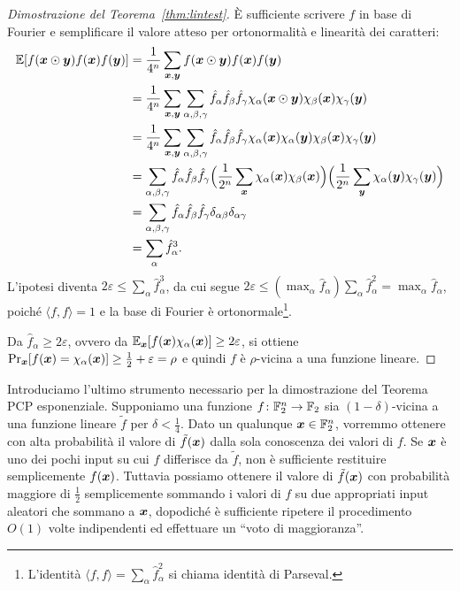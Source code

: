\begin{proof}[Dimostrazione del Teorema~\ref{thm:lintest}]
	È sufficiente scrivere $f$ in base di Fourier e semplificare il valore atteso
	per ortonormalità e linearità dei caratteri:
	\begin{align*}
		\mathbb{E}[f(\bm{x} \odot \bm{y})f(\bm{x})f(\bm{y})] &=
			\frac1{4^n} \sum_{\bm{x}, \bm{y}} f(\bm{x} \odot \bm{y}) f(\bm{x}) f(\bm{y}) \\
		&= \frac1{4^n} \sum_{\bm{x}, \bm{y}} \sum_{\alpha, \beta, \gamma}
			\hat{f}_\alpha \hat{f}_\beta \hat{f}_\gamma
			\chi_\alpha (\bm{x} \odot \bm{y}) \chi_\beta(\bm{x}) \chi_\gamma(\bm{y}) \\
		&= \frac1{4^n} \sum_{\bm{x}, \bm{y}} \sum_{\alpha, \beta, \gamma}
			\hat{f}_\alpha \hat{f}_\beta \hat{f}_\gamma
			\chi_\alpha(\bm{x}) \chi_\alpha(\bm{y}) \chi_\beta(\bm{x}) \chi_\gamma(\bm{y}) \\
		&= \sum_{\alpha, \beta, \gamma}
			\hat{f}_\alpha \hat{f}_\beta \hat{f}_\gamma
			\Big( \frac1{2^n} \sum_{\bm{x}} \chi_\alpha(\bm{x}) \chi_\beta(\bm{x}) \Big)
			\Big( \frac1{2^n} \sum_{\bm{y}} \chi_\alpha(\bm{y}) \chi_\gamma(\bm{y}) \Big) \\
		&= \sum_{\alpha, \beta, \gamma}
			\hat{f}_\alpha \hat{f}_\beta \hat{f}_\gamma
			\delta_{\alpha \beta} \delta_{\alpha \gamma} \\
		&= \sum_{\alpha} \hat{f}_\alpha^3.
	\end{align*}
	L'ipotesi diventa $2 \varepsilon \le \sum_{\alpha} \hat{f}_\alpha^3$, da
	cui segue $2 \varepsilon \le (\max_\alpha \hat{f}_\alpha)
	\sum_{\alpha} \hat{f}_\alpha^2 = \max_\alpha \hat{f}_\alpha$, poiché
	$\langle f, f \rangle = 1$ e la	base di Fourier è
	ortonormale\footnote{L'identità $\langle f, f \rangle = \sum_\alpha
	\hat{f}_\alpha^2$ si chiama identità di	Parseval.}.

	Da $\hat{f}_\alpha \ge 2 \varepsilon$, ovvero da
	$\mathbb{E}_{\bm{x}}[f(\bm{x}) \chi_\alpha (\bm{x})] \ge 2 \varepsilon$, si ottiene
	$\Pr_{\bm{x}}[f(\bm{x}) = \chi_\alpha (\bm{x})] \ge \frac12 + \varepsilon = \rho$ e
	quindi $f$ è $\rho$-vicina a una funzione lineare.
\end{proof}

Introduciamo l'ultimo strumento necessario per la dimostrazione del Teorema PCP
esponenziale. Supponiamo una funzione $f\colon \mathbb{F}_2^n \to \mathbb{F}_2$ sia
$(1 - \delta)$-vicina a una funzione lineare $\tilde{f}$ per $\delta < \frac14$.
Dato un qualunque $\bm{x} \in \mathbb{F}_2^n$, vorremmo ottenere con alta probabilità il
valore di $\tilde{f}(\bm{x})$ dalla sola conoscenza dei valori di $f$.
Se $\bm{x}$ è uno dei pochi input su cui $f$ differisce da
$\tilde{f}$, non è sufficiente restituire semplicemente $f(\bm{x})$.
Tuttavia possiamo ottenere il valore di
$\tilde{f}(\bm{x})$ con probabilità maggiore di $\frac12$ semplicemente
sommando i valori di $f$ su due appropriati input aleatori che sommano a $\bm{x}$,
dopodiché è sufficiente ripetere il procedimento $O(1)$ volte indipendenti
ed effettuare un ``voto di maggioranza''.

